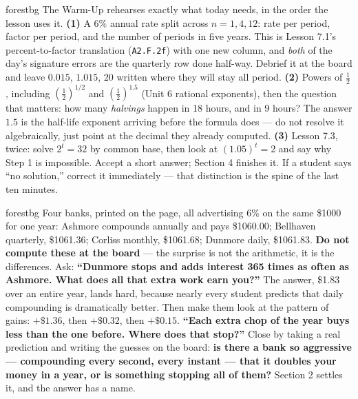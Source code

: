 \documentclass[10pt]{article}
\begin{document}
\begin{fixedskillbox}{forestbg}
    The Warm-Up rehearses exactly what today needs, in the order the lesson uses it. \textbf{(1)} A
    $6\%$ annual rate split across $n=1,4,12$: rate per period, factor per period, and the number of
    periods in five years. This is Lesson 7.1's percent-to-factor translation (\texttt{A2.F.2f}) with
    one new column, and \emph{both} of the day's signature errors are the quarterly row done half-way.
    Debrief it at the board and leave $0.015$, $1.015$, $20$ written where they will stay all period.
    \textbf{(2)} Powers of $\frac12$, including $\left(\frac12\right)^{1/2}$ and
    $\left(\frac12\right)^{1.5}$ (Unit 6 rational exponents), then the question that matters: how many
    \emph{halvings} happen in 18 hours, and in 9 hours? The answer $1.5$ is the half-life exponent
    arriving before the formula does --- do not resolve it algebraically, just point at the decimal
    they already computed. \textbf{(3)} Lesson 7.3, twice: solve $2^{t}=32$ by common base, then look
    at $(1.05)^{t}=2$ and say why Step 1 is impossible. Accept a short answer; Section 4 finishes it.
    If a student says ``no solution,'' correct it immediately --- that distinction is the spine of the
    last ten minutes.
\end{fixedskillbox}

\begin{skillbox}[Hook]{forestbg}
    Four banks, printed on the page, all advertising $6\%$ on the same \$1000 for one year: Ashmore
    compounds annually and pays \$1060.00; Bellhaven quarterly, \$1061.36; Corliss monthly, \$1061.68;
    Dunmore daily, \$1061.83. \textbf{Do not compute these at the board} --- the surprise is not the
    arithmetic, it is the differences. Ask: \textbf{``Dunmore stops and adds interest 365 times as often
    as Ashmore. What does all that extra work earn you?''} The answer, \$1.83 over an entire year, lands
    hard, because nearly every student predicts that daily compounding is dramatically better. Then make
    them look at the pattern of gains: $+\$1.36$, then $+\$0.32$, then $+\$0.15$. \textbf{``Each extra
    chop of the year buys less than the one before. Where does that stop?''} Close by taking a real
    prediction and writing the guesses on the board: \textbf{is there a bank so aggressive --- compounding
    every second, every instant --- that it doubles your money in a year, or is something stopping all of
    them?} Section 2 settles it, and the answer has a name.
\end{skillbox}
\end{document}
